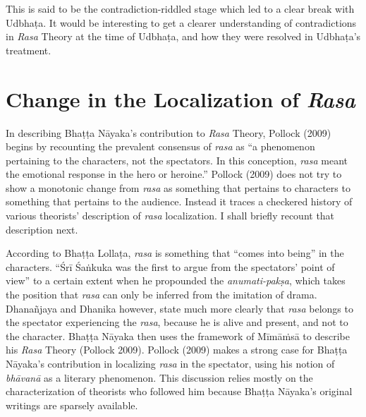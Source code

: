 This is said to be the contradiction-riddled stage which led to a clear break with Udbhaṭa. It would be interesting to get a clearer understanding of contradictions in \textsl{Rasa} Theory at the time of Udbhaṭa, and how they were resolved in Udbhaṭa’s treatment.\\[-21pt]

\section*{Change in the Localization of \textsl{Rasa}}

In describing Bhaṭṭa Nāyaka’s contribution to \textsl{Rasa} Theory, Pollock (2009) begins by recounting the prevalent consensus of \textsl{rasa} as “a phenomenon pertaining to the characters, not the spectators. In this conception, \textsl{rasa }meant the emotional response in the hero or heroine.” Pollock (2009) does not try to show a monotonic change from \textsl{rasa} as something that pertains to characters to something that pertains to the audience. Instead it traces a checkered history of various theorists’ description of \textsl{rasa} localization. I shall briefly recount that description next. 

\newpage

According to Bhaṭṭa Lollaṭa, \textsl{rasa} is something that “comes into being” in the characters. “Śrī Śaṅkuka was the first to argue from the spectators’ point of view” to a certain extent when he propounded the \textsl{anumati-pakṣa}, which takes the position that \textsl{rasa} can only be inferred from the imitation of drama. Dhanañjaya and Dhanika however, state much more clearly that \textsl{rasa} belongs to the spectator experiencing the \textsl{rasa}, because he is alive and present, and not to the character. Bhaṭṭa Nāyaka then uses the framework of Mīmāṁsā to describe his \textsl{Rasa} Theory (Pollock 2009). Pollock (2009) makes a strong case for Bhaṭṭa Nāyaka’s contribution in localizing \textsl{rasa} in the spectator, using his notion of \textsl{bhāvanā} as a literary phenomenon. This discussion relies mostly on the characterization of theorists who followed him because Bhaṭṭa Nāyaka’s original writings are sparsely available. 

